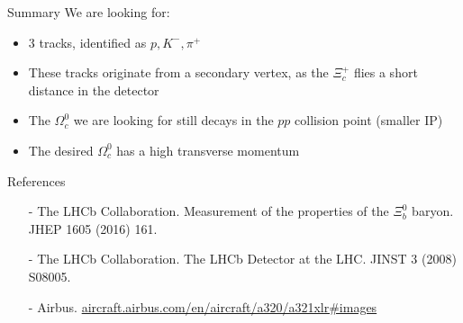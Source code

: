 \begin{frame}{Summary}
We are looking for:
\begin{spacing}{1.5}
\begin{itemize}
    \item 3 tracks, identified as $p, K^-, \pi^+$
    \item These tracks originate from a secondary vertex, as the $\Xi_c^+$ flies a short distance in the detector
    \item The $\Omega_c^0$ we are looking for still decays in the $pp$ collision point (smaller IP)
    \item The desired $\Omega_c^0$ has a high transverse momentum
\end{itemize}
\end{spacing}
\end{frame}
\begin{frame}{References} \footnotesize

    \begin{itemize}
\item[-] The LHCb Collaboration. Measurement of the properties of the $\Xi_b^0$ baryon. 	JHEP 1605 (2016) 161.
\item[-] The LHCb Collaboration. The LHCb Detector at the LHC.  JINST 3 (2008) S08005.
\item[-] Airbus. \url{aircraft.airbus.com/en/aircraft/a320/a321xlr#images}
\end{itemize}


\end{frame}



